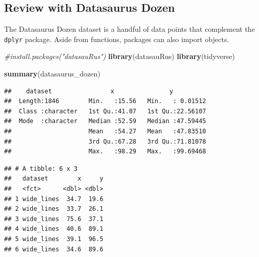 \documentclass[
]{book}
\newenvironment{Shaded}{\begin{snugshade}}{\end{snugshade}}
\newcommand{\CommentTok}[1]{\textcolor[rgb]{0.56,0.35,0.01}{\textit{#1}}}
\newcommand{\FunctionTok}[1]{\textcolor[rgb]{0.13,0.29,0.53}{\textbf{#1}}}
\newcommand{\NormalTok}[1]{#1}
\newcommand{\OtherTok}[1]{\textcolor[rgb]{0.56,0.35,0.01}{#1}}
\newcommand{\SpecialCharTok}[1]{\textcolor[rgb]{0.81,0.36,0.00}{\textbf{#1}}}
\begin{document}
\subsection{Review with Datasaurus Dozen}\label{review-with-datasaurus-dozen}

The Datasaurus Dozen dataset is a handful of data points that complement the \texttt{dplyr} package. Aside from functions, packages can also import objects.

\begin{Shaded}
\begin{Highlighting}[]
\CommentTok{\#install.packages("datasauRus")}
\FunctionTok{library}\NormalTok{(datasauRus)}
\FunctionTok{library}\NormalTok{(tidyverse)}
\end{Highlighting}
\end{Shaded}

\begin{Shaded}
\begin{Highlighting}[]
\FunctionTok{summary}\NormalTok{(datasaurus\_dozen)}
\end{Highlighting}
\end{Shaded}

\begin{verbatim}
##    dataset                x               y           
##  Length:1846        Min.   :15.56   Min.   : 0.01512  
##  Class :character   1st Qu.:41.07   1st Qu.:22.56107  
##  Mode  :character   Median :52.59   Median :47.59445  
##                     Mean   :54.27   Mean   :47.83510  
##                     3rd Qu.:67.28   3rd Qu.:71.81078  
##                     Max.   :98.29   Max.   :99.69468
\end{verbatim}

\begin{Shaded}
\end{Shaded}

\begin{verbatim}
## # A tibble: 6 x 3
##   dataset        x     y
##   <fct>      <dbl> <dbl>
## 1 wide_lines  34.7  19.6
## 2 wide_lines  33.7  26.1
## 3 wide_lines  75.6  37.1
## 4 wide_lines  40.6  89.1
## 5 wide_lines  39.1  96.5
## 6 wide_lines  34.6  89.6
\end{verbatim}
\end{document}
